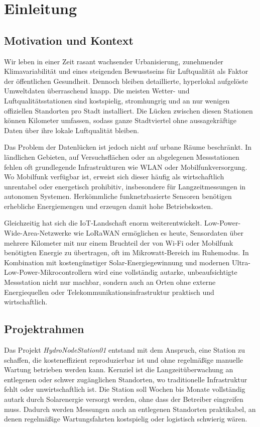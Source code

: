 \chapter{Einleitung}

\section*{Motivation und Kontext}

Wir leben in einer Zeit rasant wachsender Urbanisierung, zunehmender Klimavariabilität und eines steigenden Bewusstseins für Luftqualität als Faktor der öffentlichen Gesundheit. Dennoch bleiben detaillierte, hyperlokal aufgelöste Umweltdaten überraschend knapp. Die meisten Wetter- und Luftqualitätsstationen sind kostspielig, stromhungrig und an nur wenigen offiziellen Standorten pro Stadt installiert. Die Lücken zwischen diesen Stationen können Kilometer umfassen, sodass ganze Stadtviertel ohne aussagekräftige Daten über ihre lokale Luftqualität bleiben.

Das Problem der Datenlücken ist jedoch nicht auf urbane Räume beschränkt. In ländlichen Gebieten, auf Versuchsflächen oder an abgelegenen Messstationen fehlen oft grundlegende Infrastrukturen wie WLAN oder Mobilfunkversorgung. Wo Mobilfunk verfügbar ist, erweist sich dieser häufig als wirtschaftlich unrentabel oder energetisch prohibitiv, insbesondere für Langzeitmessungen in autonomen Systemen. Herkömmliche funknetzbasierte Sensoren benötigen erhebliche Energiemengen und erzeugen damit hohe Betriebskosten.

Gleichzeitig hat sich die IoT-Landschaft enorm weiterentwickelt. Low-Power-Wide-Area-Netzwerke wie LoRaWAN ermöglichen es heute, Sensordaten über mehrere Kilometer mit nur einem Bruchteil der von Wi-Fi oder Mobilfunk benötigten Energie zu übertragen, oft im Mikrowatt-Bereich im Ruhemodus. In Kombination mit kostengünstiger Solar-Energiegewinnung und modernen Ultra-Low-Power-Mikrocontrollern wird eine vollständig autarke, unbeaufsichtigte Messstation nicht nur machbar, sondern auch an Orten ohne externe Energiequellen oder Telekommunikationsinfrastruktur praktisch und wirtschaftlich.

\section*{Projektrahmen}

Das Projekt \textit{HydroNodeStation01} entstand mit dem Anspruch, eine Station zu schaffen, die kosteneffizient reproduzierbar ist und ohne regelmäßige manuelle Wartung betrieben werden kann. Kernziel ist die Langzeitüberwachung an entlegenen oder schwer zugänglichen Standorten, wo traditionelle Infrastruktur fehlt oder unwirtschaftlich ist. Die Station soll Wochen bis Monate vollständig autark durch Solarenergie versorgt werden, ohne dass der Betreiber eingreifen muss. Dadurch werden Messungen auch an entlegenen Standorten praktikabel, an denen regelmäßige Wartungsfahrten kostspielig oder logistisch schwierig wären.

